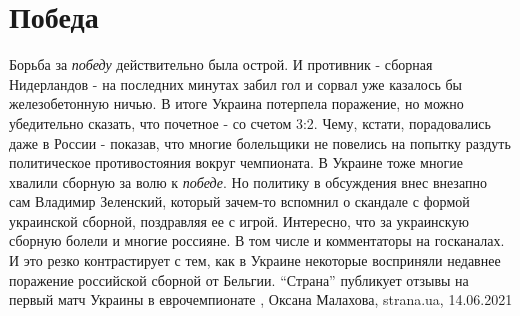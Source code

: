  
 
 
 
 
\chapter{Победа}

Борьба за \emph{победу} действительно была острой. И противник - сборная Нидерландов -
на последних минутах забил гол и сорвал уже казалось бы железобетонную ничью.
В итоге Украина потерпела поражение, но можно убедительно сказать, что почетное
- со счетом 3:2. Чему, кстати, порадовались даже в России - показав, что многие
болельщики не повелись на попытку раздуть политическое противостояния вокруг
чемпионата. В Украине тоже многие хвалили сборную за волю к \emph{победе}. Но
политику в обсуждения внес внезапно сам Владимир Зеленский, который зачем-то
вспомнил о скандале с формой украинской сборной, поздравляя ее с игрой.
Интересно, что за украинскую сборную болели и многие россияне. В том числе и
комментаторы на госканалах. И это резко контрастирует с тем, как в Украине
некоторые восприняли недавнее поражение российской сборной от Бельгии.
\enquote{Страна} публикует отзывы на первый матч Украины в еврочемпионате
, 
Оксана Малахова, strana.ua, 14.06.2021

